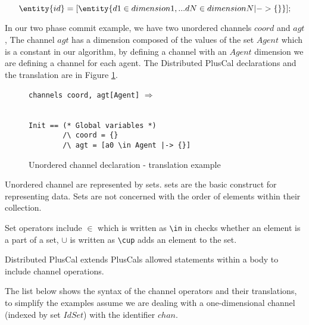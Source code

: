 \[
 \entity{id} = [\entity{d1 \in dimension1,... dN \in dimensionN |-> \{ \}}];
\]

In our two phase commit example, we have two unordered channels $coord$ and $agt$, The channel $agt$ has a dimension composed of the values of the set $Agent$ which is a constant in our algorithm, by defining a channel with an $Agent$ dimension we are defining a channel for each agent.
The Distributed PlusCal declarations and the \tlaplus translation are in Figure \ref{2pcchannels}.


\FloatBarrier
\begin{figure}[!h]

\begin{minipage}{.3\textwidth}

\lstinline|channels coord, agt[Agent]| $\Rightarrow$ \\\\
\end{minipage}\hfill
\begin{minipage}{.7\textwidth}
\begin{lstlisting}[frame = none, numbers = none]
Init == (* Global variables *)
        /\ coord = {}
        /\ agt = [a0 \in Agent |-> {}]
\end{lstlisting}

\end{minipage}\hfill

\caption{Unordered channel declaration - \tlaplus translation example}
\label{2pcchannels}
\end{figure}
\FloatBarrier

Unordered channel are represented by \tlaplus sets. \tlaplus sets are the basic construct for representing data. Sets are not concerned with the order of elements within their collection.

Set operators include $\in$ which is written as \lstinline|\in| in \tlaplus checks whether an element is a part of a set, $\cup$ is written as \lstinline|\cup| adds an element to the set.\newline

Distributed PlusCal extends PlusCals allowed statements within a body to include channel operations.

The list below shows the syntax of the channel operators and their \tlaplus translations, to simplify the examples assume we are dealing with a one-dimensional channel (indexed by set $IdSet$) with the identifier $chan$.

